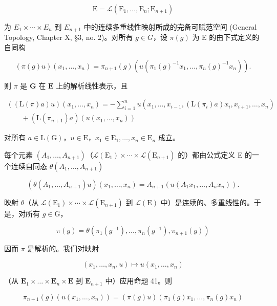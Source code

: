 \[
\mathrm{E} = \mathscr {L} (\mathrm{E} _ {1}, \dots , \mathrm{E} _ {n}; \mathrm{E} _ {n + 1})
\]

为 \(E_{1} \times \cdots \times E_{n}\) 到 \(E_{n+1}\) 中的连续多重线性映射所成的完备可赋范空间 (General Topology, Chapter X, §3, no. 2)。对所有 \(g \in G\)，设 \(\pi(g)\) 为 E 的由下式定义的自同构

\[
(\pi (g) u) (x _ {1}, \dots , x _ {n}) = \pi_ {n + 1} (g) (u (\pi_ {1} (g) ^ {- 1} x _ {1}, \dots , \pi_ {n} (g) ^ {- 1} x _ {n})).
\]

则 \(\pi\) 是 \(\mathbf{G}\) 在 \(\mathbf{E}\) 上的解析线性表示，且

\[
\begin{array}{l} ((\mathrm{L} (\pi) a) u) (x _ {1}, \ldots , x _ {n}) = - \sum_ {i = 1} ^ {n} u (x _ {1}, \ldots , x _ {i - 1}, (\mathrm{L} (\pi_ {i}) a) x _ {i}, x _ {i + 1}, \ldots , x _ {n}) \\ \qquad + (\mathrm{L} (\pi_ {n + 1}) a) (u (x _ {1}, \ldots , x _ {n})) \end{array}
\]

对所有 \(a \in \mathrm{L}(\mathrm{G})\)，\(u \in \mathrm{E}\)，\(x_1 \in \mathrm{E}_1, \ldots, x_n \in \mathrm{E}_n\) 成立。

每个元素 \((A_{1},\ldots,A_{n+1})\)（\(\mathcal{L}(\mathrm{E}_{1})\times\cdots\times\mathcal{L}(\mathrm{E}_{n+1})\) 的）都由公式定义 E 的一个连续自同态 \(\theta(A_{1},\ldots,A_{n+1})\)

\[
(\theta (A _ {1}, \dots , A _ {n + 1}) u) (x _ {1}, \dots , x _ {n}) = A _ {n + 1} (u (A _ {1} x _ {1}, \dots , A _ {n} x _ {n})).
\]

映射 \(\theta\)（从 \(\mathcal{L}(\mathrm{E}_1) \times \cdots \times \mathcal{L}(\mathrm{E}_{n+1})\) 到 \(\mathcal{L}(\mathrm{E})\) 中）是连续的、多重线性的。于是，对所有 \(g \in \mathrm{G}\)，

\[
\pi (g) = \theta (\pi_ {1} (g ^ {- 1}), \dots , \pi_ {n} (g ^ {- 1}), \pi_ {n + 1} (g))
\]

因而 \(\pi\) 是解析的。我们对映射

\[
\left(x _ {1}, \dots , x _ {n}, u\right) \mapsto u \left(x _ {1}, \dots , x _ {n}\right)
\]

（从 \(\mathbf{E}_1\times \dots \times \mathbf{E}_n\times \mathbf{E}\) 到 \(\mathbf{E}_{n + 1}\) 中）应用命题 41。则

\[
\pi_ {n + 1} (g) \left(u \left(x _ {1}, \dots , x _ {n}\right)\right) = (\pi (g) u) \left(\pi_ {1} (g) x _ {1}, \dots , \pi_ {n} (g) x _ {n}\right)
\]

